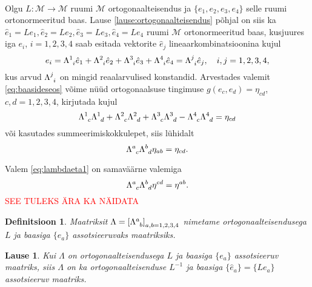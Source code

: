 \documentclass[a4paper,12pt]{article}
\newtheorem{definitsioon}{Definitsioon}[section]
\newtheorem{lause}{Lause}[section]
\numberwithin{equation}{section}
\begin{document}
\paragraph{} Olgu $L : \mathcal{M} \rightarrow \mathcal{M}$ ruumi $\mathcal{M}$ ortogonaalteisendus ja $\{e_1, e_2, e_3, e_4\}$ selle ruumi ortonormeeritud baas. Lause \ref{lause:ortogonaalteisendus} põhjal on siis ka $\hat{e}_1 = Le_1, \hat{e}_2  = Le_2, \hat{e}_3 = Le_3, \hat{e}_4 = Le_4$ ruumi $\mathcal{M}$ ortonormeeritud baas, kusjuures iga $e_i$, $i = 1,2,3,4$ saab esitada vektorite $\hat{e}_j$ lineaarkombinatsioonina kujul
\begin{equation} \label{eq:baasideseos}
e_i = \Lambda\indices{^1_i} \hat{e}_1 + \Lambda\indices{^2_i} \hat{e}_2 + \Lambda\indices{^3_i} \hat{e}_3 + \Lambda\indices{^4_i} \hat{e}_4 = \Lambda\indices{^j_i} \hat{e}_j, \quad i,j = 1, 2, 3, 4,
\end{equation}
kus arvud $\Lambda\indices{^j_i}$ on mingid reaalarvulised konstandid. Arvestades valemit \ref{eq:baasideseos} võime nüüd ortogonaalsuse tingimuse $g \left(e_c, e_d\right) = \eta_{cd}$, $c, d = 1, 2, 3, 4$, kirjutada kujul
\begin{equation}
\Lambda\indices{^1_c} \Lambda\indices{^1_d} + \Lambda\indices{^2_c} \Lambda\indices{^2_d} + \Lambda\indices{^3_c} \Lambda\indices{^3_d} - \Lambda\indices{^4_c} \Lambda\indices{^4_d} = \eta_{cd}
\end{equation}
või kasutades summeerimiskokkulepet, siis lühidalt
\begin{equation} \label{eq:lambdaeta1}
\Lambda\indices{^a_c} \Lambda\indices{^b_d} \eta_{ab} = \eta_{cd}.
\end{equation}

Valem \ref{eq:lambdaeta1} on samaväärne valemiga
\begin{equation} \label{eq:lambdaeta2}
\Lambda\indices{^a_c} \Lambda\indices{^b_d} \eta^{cd} = \eta^{ab}.
\end{equation}
\textcolor{red}{SEE TULEKS ÄRA KA NÄIDATA}
\begin{definitsioon}
Maatriksit $\Lambda = \left[\Lambda\indices{^a_b} \right]_{a,b=1,2,3,4}$ nimetame \emph{ortogonaalteisendusega $L$ ja baasiga $\{e_a\}$} assotsieeruvaks maatriksiks.
\end{definitsioon}
\begin{lause}
Kui $\Lambda$ on ortogonaalteisendusega $L$ ja baasiga $\{e_a\}$ assotsieeruv maatriks, siis $\Lambda$ on ka ortogonaalteisenduse $L^{-1}$ ja baasiga $\{\hat{e}_a\} = \{Le_a\}$ assotsieeruv maatriks.
\end{lause}
\end{document}

